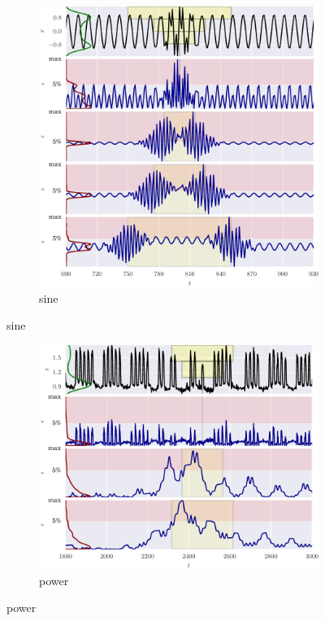 \begin{figure}
    \ContinuedFloat 
  
    \begin{subfigure}[t]{\textwidth}
        \centering
        \includegraphics[]{figs/er_sin.pdf}
        \caption{sine}
    \end{subfigure}%

\end{figure}
\begin{figure}
    \ContinuedFloat 

    \begin{subfigure}[t]{\textwidth} 
        \centering
        \includegraphics[]{figs/er_power.pdf}
        \caption{power}
    \end{subfigure}%

\end{figure}
